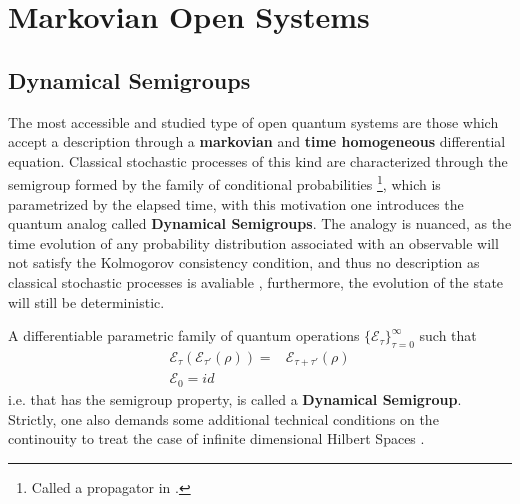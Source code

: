 \chapter{Markovian Open Systems}
\section{Dynamical Semigroups}
The most accessible and studied type of open quantum systems are those which accept a description through a \textbf{markovian} and \textbf{time
  homogeneous} differential equation. Classical stochastic processes of this kind are characterized through the semigroup
formed by the family of conditional probabilities \footnote{Called a propagator in \cite{breuer2002theory}.}, which is parametrized by the
elapsed time, with this motivation one introduces the quantum analog called \textbf{Dynamical Semigroups}. The analogy is nuanced, as the
time evolution of any probability distribution associated with an observable will not satisfy the Kolmogorov consistency condition, and thus
no description as classical stochastic processes is avaliable \cite{strasberg2022quantum}, furthermore, the evolution of the state
will still be deterministic.

\begin{definition}
  A differentiable parametric family of quantum operations $\{\mathcal{E}_{\tau}\}_{\tau=0}^{\infty}$ such that
  \begin{align}
    \mathcal{E}_{\tau}(\mathcal{E}_{\tau'}(\rho)) =& \mathcal{E}_{\tau + \tau'}(\rho)\\
    \mathcal{E}_{0} = id
  \end{align}
  i.e. that has the semigroup property, is called a \textbf{Dynamical Semigroup}. Strictly, one also demands
  some additional technical conditions on the continouity to treat the case of infinite dimensional Hilbert Spaces \cite{lindblad1976generators}.
\end{definition}

